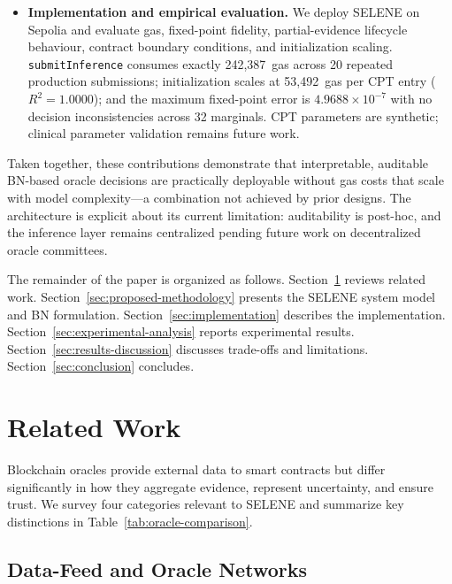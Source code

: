 \documentclass[journal]{IEEEtran}
\theoremstyle{definition}
\theoremstyle{remark}
\begin{document}
\begin{itemize}
  \item \textbf{Implementation and empirical evaluation.}
  We deploy SELENE on Sepolia and evaluate gas,
  fixed-point fidelity, partial-evidence lifecycle
  behaviour, contract boundary conditions, and
  initialization scaling. \texttt{submitInference}
  consumes exactly 242{,}387~gas across 20 repeated
  production submissions; initialization scales at
  53{,}492~gas per CPT entry ($R^2=1.0000$); and the
  maximum fixed-point error is
  $4.9688\times10^{-7}$ with no decision
  inconsistencies across 32 marginals. CPT parameters are
  synthetic; clinical parameter validation remains future
  work.

\end{itemize}

Taken together, these contributions demonstrate that
interpretable, auditable BN-based oracle decisions are
practically deployable without gas costs that scale with
model complexity---a combination not achieved by prior
designs.
The architecture is explicit about its current
limitation: auditability is post-hoc, and the inference
layer remains centralized pending future work on
decentralized oracle committees.

The remainder of the paper is organized as follows.
Section~\ref{sec:relatedwork} reviews related work.
Section~\ref{sec:proposed-methodology} presents the SELENE
system model and BN formulation.
Section~\ref{sec:implementation} describes the
implementation.
Section~\ref{sec:experimental-analysis} reports
experimental results.
Section~\ref{sec:results-discussion} discusses trade-offs
and limitations.
Section~\ref{sec:conclusion} concludes.


\section{Related Work}
\label{sec:relatedwork}

Blockchain oracles provide external data to smart
contracts but differ significantly in how they aggregate
evidence, represent uncertainty, and ensure trust.
We survey four categories relevant to SELENE and summarize
key distinctions in Table~\ref{tab:oracle-comparison}.

\subsection{Data-Feed and Oracle Networks}
\end{document}
